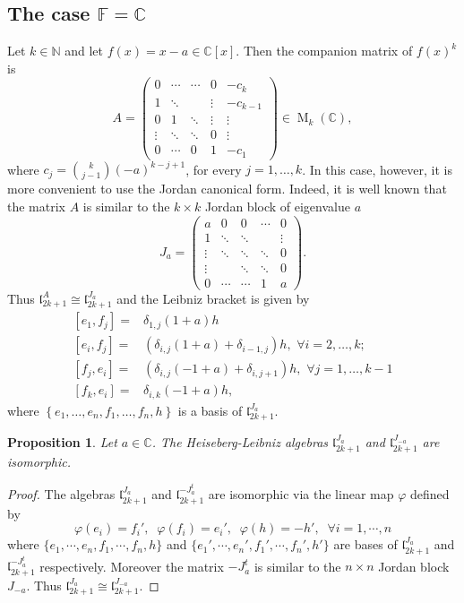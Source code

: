 \documentclass[english,4paper,10pt]{article}
\newcommand{\F}{\mathbb{F}}
\newtheorem{prop}[thm]{Proposition}
\begin{document}
\subsection{The case $\F=\mathbb{C}$}
Let $k\in\mathbb{N}$ and let $f(x)=x-a\in\mathbb{C}[x]$. Then the companion matrix of $f(x)^k$ is
$$
A=
\begin{pmatrix}
	0 & \cdots & \cdots & 0 & -c_k \\
	1 & \ddots & & \vdots & -c_{k-1} \\
	0 & 1 & \ddots & \vdots & \vdots \\
	\vdots & \ddots & \ddots & 0 & \vdots \\
	0 & \cdots & 0 & 1 & -c_1
\end{pmatrix}\in \operatorname{M}_k(\mathbb{C}),
$$
where  $c_j=\binom{k}{j-1}(-a)^{k-j+1}$, for every $j=1,\ldots,k$. In this case, however, it is more convenient to use the Jordan canonical form. Indeed, it is well known that the matrix $A$ is similar to the $k\times k$ Jordan block of eigenvalue $a$
$$
J_a=\begin{pmatrix}
	a&0&0&\cdots&0         \\                       
	1&\ddots&\ddots&&\vdots      \\
	\vdots&\ddots&\ddots&\ddots&0\\
	\vdots&&\ddots&\ddots&0     \\
	0&\cdots&\cdots&1&a   
\end{pmatrix}.
$$
Thus $\mathfrak{l}_{2k+1}^A\cong\mathfrak{l}_{2k+1}^{J_a}$ and the Leibniz bracket is given by
\begin{align*}
	\left[e_1,f_j\right]=& \delta_{1,j}(1+a)h \\
\left[e_i,f_j\right]=&(\delta_{i,j}(1+a)+\delta_{i-1,j})h,\,\,\forall i=2,\ldots,k; \\
\left[f_j,e_i\right]=&(\delta_{i,j}(-1+a)+\delta_{i,j+1})h,\,\,\forall j=1,\ldots,k-1\\
\left[f_k,e_i\right]=& \delta_{i,k}(-1+a)h,
\end{align*} 
where $\left\{e_1,\ldots,e_n,f_1,\ldots, f_n,h\right\}$ is a basis of $\mathfrak{l}_{2k+1}^{J_a}$.

\begin{prop}
	Let $a \in \mathbb{C}$. The Heiseberg-Leibniz algebras $\mathfrak{l}_{2k+1}^{J_a}$ and $\mathfrak{l}_{2k+1}^{J_{-a}}$ are isomorphic.
\end{prop}

\begin{proof} The algebras
	$\mathfrak{l}_{2k+1}^{J_a}$ and $\mathfrak{l}_{2k+1}^{-J_a^t}$ are isomorphic via the linear map $\varphi$ defined by
	$$
	\varphi(e_i)=f_i', \; \; \varphi(f_i)=e_i', \; \; \varphi(h)=-h', \; \; \forall i=1,\cdots,n
	$$
	where $\lbrace e_1,\cdots,e_n,f_1,\cdots,f_n,h\rbrace$ and $\lbrace e_1',\cdots,e_n',f_1',\cdots,f_n',h'\rbrace$ are bases of $\mathfrak{l}_{2k+1}^{J_a}$ and $\mathfrak{l}_{2k+1}^{-J_a^t}$ respectively. Moreover the matrix $-J_a^t$ is similar to the $n \times n$ Jordan block $J_{-a}$. Thus $\mathfrak{l}_{2k+1}^{J_a} \cong \mathfrak{l}_{2k+1}^{J_{-a}}$.
\end{proof}
\end{document}
